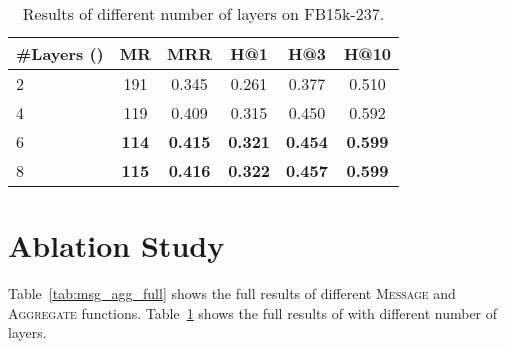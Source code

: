 \begin{table}[!h]
\begin{minipage}{0.42\textwidth}
    \centering
    \caption{Results of different number of layers on FB15k-237.}
    \begin{adjustbox}{max width=\textwidth}
    \begin{tabular}{lccccc}
        \toprule
        \bf{\#Layers ()} & \bf{MR} & \bf{MRR} & \bf{H@1} & \bf{H@3} & \bf{H@10} \\
        \midrule
        2 & 191 & 0.345 & 0.261 & 0.377 & 0.510 \\
        4 & 119 & 0.409 & 0.315 & 0.450 & 0.592 \\
        6 & \bf{114} & \bf{0.415} & \bf{0.321} & \bf{0.454} & \bf{0.599} \\
        8 & \bf{115} & \bf{0.416} & \bf{0.322} & \bf{0.457} & \bf{0.599} \\
        \bottomrule
    \end{tabular}
    \end{adjustbox}
    \label{tab:num_layer_full}
    \end{minipage}
\end{table}

\section{Ablation Study}
\label{app:ablation}

Table~\ref{tab:msg_agg_full} shows the full results of different \textsc{Message} and \textsc{Aggregate} functions. Table~\ref{tab:num_layer_full} shows the full results of \method with different number of layers.
